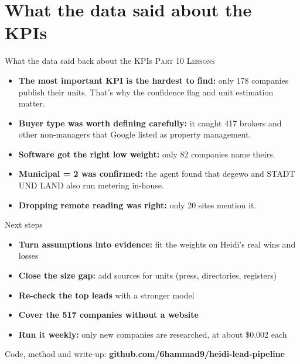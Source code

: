 \documentclass[aspectratio=169,11pt]{beamer}
\newcommand{\partlabel}[1]{{\small\color{assume}\textsc{#1}}\par\vspace{0.3em}}
\begin{document}
\section{What the data said about the KPIs}

\begin{frame}{What the data said back about the KPIs}
  \partlabel{Part 10 \textbullet{} Lessons}
  \begin{itemize}
    \item \textbf{The most important KPI is the hardest to find:} only 178 companies publish
          their units. That's why the confidence flag and unit estimation matter.
    \item \textbf{Buyer type was worth defining carefully:} it caught 417 brokers and other
          non-managers that Google listed as property management.
    \item \textbf{Software got the right low weight:} only 82 companies name theirs.
    \item \textbf{Municipal = 2 was confirmed:} the agent found that degewo and STADT UND LAND
          also run metering in-house.
    \item \textbf{Dropping remote reading was right:} only 20 sites mention it.
  \end{itemize}
\end{frame}

\begin{frame}{Next steps}
  \begin{itemize}
    \item \textbf{Turn assumptions into evidence:} fit the weights on Heidi's real wins and
          losses
    \item \textbf{Close the size gap:} add sources for units (press, directories, registers)
    \item \textbf{Re-check the top leads} with a stronger model
    \item \textbf{Cover the 517 companies without a website}
    \item \textbf{Run it weekly:} only new companies are researched, at about \$0.002 each
  \end{itemize}
  \vspace{1em}
  Code, method and write-up: \textbf{github.com/6hammad9/heidi-lead-pipeline}
\end{frame}
\end{document}
